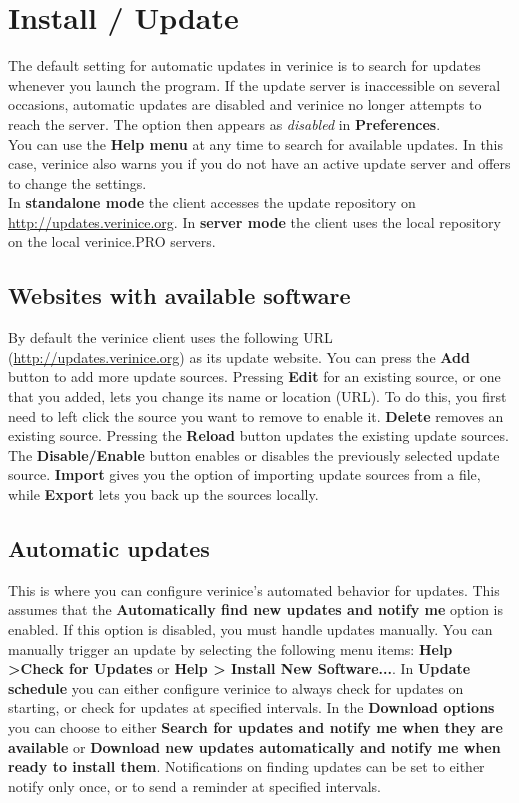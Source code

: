 \documentclass[a4paper,10pt]{book}
\begin{document}
\section{Install / Update} \label{Install / Update}
The default setting for automatic updates in verinice is to search for updates whenever you launch the program.
If the update server is inaccessible on several occasions, automatic updates are disabled and verinice no longer
attempts to reach the server. The option then appears as {\em disabled} in \textbf{Preferences}.
\newline\\
You can use the \textbf{Help menu} at any time to search for available updates. In this case, verinice also warns you if you do not
have an active update server and offers to change the settings.
\newline\\
In \textbf{standalone mode} the client accesses the update repository on
\newline \href{http://updates.verinice.org}{http://updates.verinice.org}.
In \textbf{server mode} the client uses the local repository on the local verinice.\textsc{PRO} servers.

\subsection{Websites with available software}
By default the verinice client uses the following URL (\href{http://updates.verinice.org}{http://updates.verinice.org})
as its update website. You can press the \textbf{Add} button to add more update sources.
Pressing \textbf{Edit} for an existing source, or one that you added, lets you change its name or location (URL).
To do this, you first need to left click the source you want to remove to enable it. \textbf{Delete} removes an existing source.
Pressing the \textbf{Reload} button updates the existing update sources. The \textbf{Disable/Enable} button enables
or disables the previously selected update source. \textbf{Import} gives you the option of importing update sources from a
file, while \textbf{Export} lets you back up the sources locally.

\subsection{Automatic updates}
This is where you can configure verinice's automated behavior for updates. This assumes that the
\textbf{Automatically find new updates and notify me} option is enabled. If this option is disabled, you must handle updates manually.
You can manually trigger an update by selecting the following menu items: \textbf{Help \textgreater Check for Updates} or \textbf{Help \textgreater
Install New Software...}. In \textbf{Update schedule} you can either configure verinice to always check for updates on starting,
or check for updates at specified intervals. In the \textbf{Download options} you can choose to either
\textbf{Search for updates and notify me when they are available} or \textbf{Download new updates automatically and notify me when ready to install them}.
Notifications on finding updates can be set to either notify only once, or to send a reminder at specified intervals.
\end{document}
